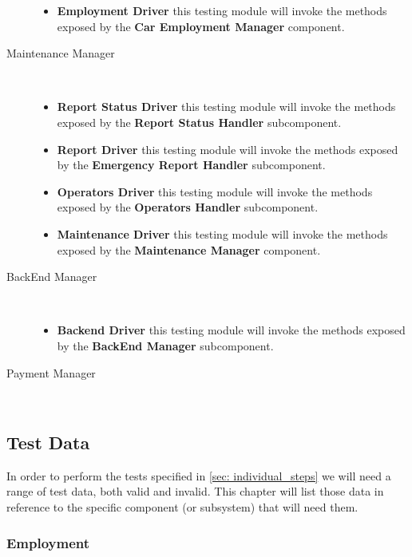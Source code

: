 \begin{description}
\begin{itemize}
				\item \textbf{Employment Driver} this testing module will invoke the methods exposed by the \textbf{Car Employment Manager} component.
			\end{itemize}
		\item[Maintenance Manager]~\\
			\begin{itemize}
				\item \textbf{Report Status Driver} this testing module will invoke the methods exposed by the \textbf{Report Status Handler} subcomponent.
				\item \textbf{Report Driver} this testing module will invoke the methods exposed by the \textbf{Emergency Report Handler} subcomponent.
				\item \textbf{Operators Driver} this testing module will invoke the methods exposed by the \textbf{Operators Handler} subcomponent.
				\item \textbf{Maintenance Driver} this testing module will invoke the methods exposed by the \textbf{Maintenance Manager} component.
			\end{itemize}	
		\item[BackEnd Manager]~\\
			\begin{itemize}
				\item \textbf{Backend Driver} this testing module will invoke the methods exposed by the \textbf{BackEnd Manager} subcomponent.
			\end{itemize}
		\item[Payment Manager]~\\ %
		\end{description}
		
	
	
	
	\subsection{Test Data}
	
	In order to perform the tests specified in \autoref{sec: individual_steps} we will need a range of test data, both valid and invalid. This chapter will list those data in reference to the specific component (or subsystem) that will need them. %
	
		
	
		\subsubsection{Employment}
		
